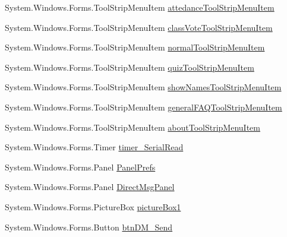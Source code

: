 \begin{DoxyCompactItemize}
\-System.\-Windows.\-Forms.\-Tool\-Strip\-Menu\-Item \hyperlink{class_sr_p___classroom_inq_1_1frm_classrrom_inq_a2ccfb297c675044ba746ce9c6839c2bc}{attedance\-Tool\-Strip\-Menu\-Item}
\item 
\-System.\-Windows.\-Forms.\-Tool\-Strip\-Menu\-Item \hyperlink{class_sr_p___classroom_inq_1_1frm_classrrom_inq_add88d2c77e31773b18b9a6b571f3207f}{class\-Vote\-Tool\-Strip\-Menu\-Item}
\item 
\-System.\-Windows.\-Forms.\-Tool\-Strip\-Menu\-Item \hyperlink{class_sr_p___classroom_inq_1_1frm_classrrom_inq_a19933124599a8ff87bd0d7fd10808c4e}{normal\-Tool\-Strip\-Menu\-Item}
\item 
\-System.\-Windows.\-Forms.\-Tool\-Strip\-Menu\-Item \hyperlink{class_sr_p___classroom_inq_1_1frm_classrrom_inq_a01bd4f13b978688a925fcace4c5f92bc}{quiz\-Tool\-Strip\-Menu\-Item}
\item 
\-System.\-Windows.\-Forms.\-Tool\-Strip\-Menu\-Item \hyperlink{class_sr_p___classroom_inq_1_1frm_classrrom_inq_a128944d3506ac87f9278cc8917a9e6f0}{show\-Names\-Tool\-Strip\-Menu\-Item}
\item 
\-System.\-Windows.\-Forms.\-Tool\-Strip\-Menu\-Item \hyperlink{class_sr_p___classroom_inq_1_1frm_classrrom_inq_a457cf8afff4e2fd2d76ffa56065350ad}{general\-F\-A\-Q\-Tool\-Strip\-Menu\-Item}
\item 
\-System.\-Windows.\-Forms.\-Tool\-Strip\-Menu\-Item \hyperlink{class_sr_p___classroom_inq_1_1frm_classrrom_inq_a91d70ebcd0a0ce1237f845c90919cc8b}{about\-Tool\-Strip\-Menu\-Item}
\item 
\-System.\-Windows.\-Forms.\-Timer \hyperlink{class_sr_p___classroom_inq_1_1frm_classrrom_inq_ae222e5fb7d4ed8ef65c9c3ff836cecf6}{timer\-\_\-\-Serial\-Read}
\item 
\-System.\-Windows.\-Forms.\-Panel \hyperlink{class_sr_p___classroom_inq_1_1frm_classrrom_inq_aac0efdb76f2989a17842359cc1a15ec9}{\-Panel\-Prefs}
\item 
\-System.\-Windows.\-Forms.\-Panel \hyperlink{class_sr_p___classroom_inq_1_1frm_classrrom_inq_a3241f0f690675052aff4224bc4fabc3d}{\-Direct\-Msg\-Panel}
\item 
\-System.\-Windows.\-Forms.\-Picture\-Box \hyperlink{class_sr_p___classroom_inq_1_1frm_classrrom_inq_ab971146df86e1277868bef4199a7b8f4}{picture\-Box1}
\item 
\-System.\-Windows.\-Forms.\-Button \hyperlink{class_sr_p___classroom_inq_1_1frm_classrrom_inq_a5633d72d43c108b34eb912acdcc81878}{btn\-D\-M\-\_\-\-Send}
\item 

\end{DoxyCompactItemize}
